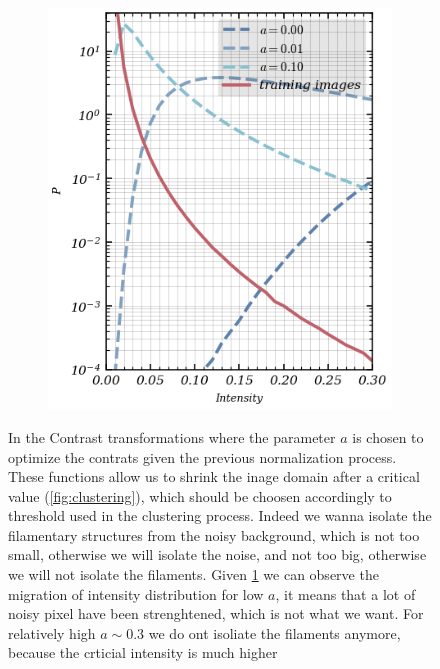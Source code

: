 \documentclass[11pt,a4paper]{report}
\begin{document}
\begin{multicols*}{2}
\begin{figure}[H]
\begin{subfigure}[H]{.6\linewidth}
        \end{subfigure}
        \hfill
        \begin{subfigure}[H]{.35\linewidth}
            \vspace{-1.5cm}
            \caption{}
            \includegraphics[width=\linewidth]{./figure/distr_transfo.png}
            \label{fig:density}
        \end{subfigure}

        \caption{In the Contrast transformations where the parameter $a$ is chosen to optimize the contrats given the previous normalization process. These functions allow us to shrink the inage domain after a critical value (\ref{fig:clustering}), which should be choosen accordingly to threshold used in the clustering process.
            Indeed we wanna isolate the filamentary structures from the noisy background, which is not too small, otherwise we will isolate the noise, and not too big, otherwise we will not isolate the filaments. Given \ref{fig:density} we can observe the migration of intensity distribution for low $a$, it means that a lot of noisy pixel have been strenghtened, which is not what we want. For relatively high $a  \sim 0.3$ we do ont isoliate the filaments anymore, because the crticial intensity is much higher}
        \label{}


\end{figure}
\end{multicols*}
\end{document}
